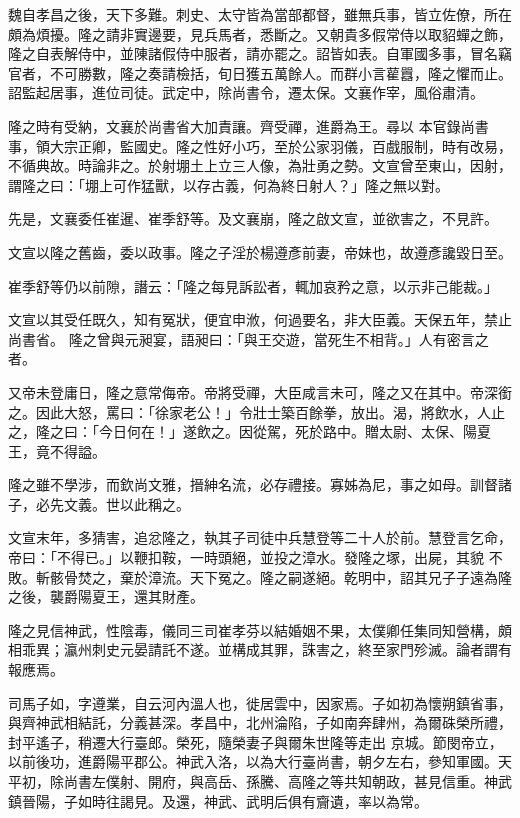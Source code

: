 \begin{pinyinscope}
 魏自孝昌之後，天下多難。刺史、太守皆為當部都督，雖無兵事，皆立佐僚，所在頗為煩擾。隆之請非實邊要，見兵馬者，悉斷之。又朝貴多假常侍以取貂蟬之飾，隆之自表解侍中，並陳諸假侍中服者，請亦罷之。詔皆如表。自軍國多事，冒名竊官者，不可勝數，隆之奏請檢括，旬日獲五萬餘人。而群小言雚囂，隆之懼而止。詔監起居事，進位司徒。武定中，除尚書令，遷太保。文襄作宰，風俗肅清。



 隆之時有受納，文襄於尚書省大加責讓。齊受禪，進爵為王。尋以
 本官錄尚書事，領大宗正卿，監國史。隆之性好小巧，至於公家羽儀，百戲服制，時有改易，不循典故。時論非之。於射堋土上立三人像，為壯勇之勢。文宣曾至東山，因射，謂隆之曰：「堋上可作猛獸，以存古義，何為終日射人？」隆之無以對。



 先是，文襄委任崔暹、崔季舒等。及文襄崩，隆之啟文宣，並欲害之，不見許。



 文宣以隆之舊齒，委以政事。隆之子淫於楊遵彥前妻，帝妹也，故遵彥讒毀日至。



 崔季舒等仍以前隙，譖云：「隆之每見訴訟者，輒加哀矜之意，以示非己能裁。」



 文宣以其受任既久，知有冤狀，便宜申浟，何過要名，非大臣義。天保五年，禁止尚書省。
 隆之曾與元昶宴，語昶曰：「與王交遊，當死生不相背。」人有密言之者。



 又帝未登庸日，隆之意常侮帝。帝將受禪，大臣咸言未可，隆之又在其中。帝深銜之。因此大怒，罵曰：「徐家老公！」令壯士築百餘拳，放出。渴，將飲水，人止之，隆之曰：「今日何在！」遂飲之。因從駕，死於路中。贈太尉、太保、陽夏王，竟不得謚。



 隆之雖不學涉，而欽尚文雅，搢紳名流，必存禮接。寡姊為尼，事之如母。訓督諸子，必先文義。世以此稱之。



 文宣末年，多猜害，追忿隆之，執其子司徒中兵慧登等二十人於前。慧登言乞命，帝曰：「不得已。」以鞭扣鞍，一時頭絕，並投之漳水。發隆之塚，出屍，其貌
 不敗。斬骸骨焚之，棄於漳流。天下冤之。隆之嗣遂絕。乾明中，詔其兄子子遠為隆之後，襲爵陽夏王，還其財產。



 隆之見信神武，性陰毒，儀同三司崔孝芬以結婚姻不果，太僕卿任集同知營構，頗相乖異；瀛州刺史元晏請託不遂。並構成其罪，誅害之，終至家門殄滅。論者謂有報應焉。



 司馬子如，字遵業，自云河內溫人也，徙居雲中，因家焉。子如初為懷朔鎮省事，與齊神武相結託，分義甚深。孝昌中，北州淪陷，子如南奔肆州，為爾硃榮所禮，封平遙子，稍遷大行臺郎。榮死，隨榮妻子與爾朱世隆等走出
 京城。節閔帝立，以前後功，進爵陽平郡公。神武入洛，以為大行臺尚書，朝夕左右，參知軍國。天平初，除尚書左僕射、開府，與高岳、孫騰、高隆之等共知朝政，甚見信重。神武鎮晉陽，子如時往謁見。及還，神武、武明后俱有齎遺，率以為常。




\end{pinyinscope}

